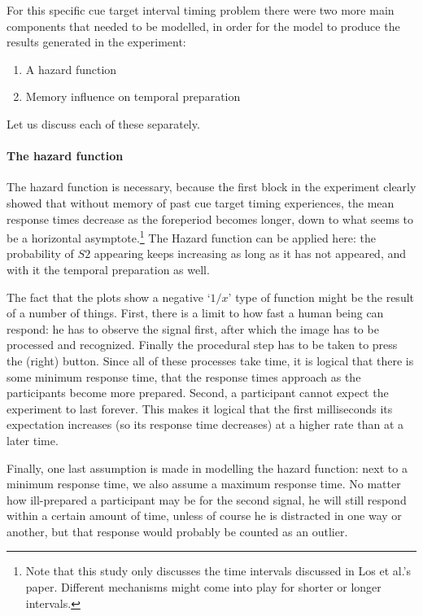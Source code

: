 \documentclass[10pt,letterpaper]{article}
\begin{document}
For this specific cue target interval timing problem there were two more main components that needed to be modelled, in order for the model to produce the results generated in the experiment:
\begin{enumerate}
	\item A hazard function
	\item Memory influence on temporal preparation
\end{enumerate}
Let us discuss each of these separately.

\paragraph{The hazard function}
The hazard function is necessary, because the first block in the experiment clearly showed that without memory of past cue target timing experiences, the mean response times decrease as the foreperiod becomes longer, down to what seems to be a horizontal asymptote.\footnote{Note that this study only discusses the time intervals discussed in Los et al.'s paper. Different mechanisms might come into play for shorter or longer intervals.} The Hazard function can be applied here: the probability of $S2$ appearing keeps increasing as long as it has not appeared, and with it the temporal preparation as well. 

The fact that the plots show a negative `$1/x$' type of function might be the result of a number of things. First, there is a limit to how fast a human being can respond: he has to observe the signal first, after which the image has to be processed and recognized. Finally the procedural step has to be taken to press the (right) button. Since all of these processes take time, it is logical that there is some minimum response time, that the response times approach as the participants become more prepared. Second, a participant cannot expect the experiment to last forever. This makes it logical that the first milliseconds its expectation increases (so its response time decreases) at a higher rate than at a later time. 

Finally, one last assumption is made in modelling the hazard function: next to a minimum response time, we also assume a maximum response time. No matter how ill-prepared a participant may be for the second signal, he will still respond within a certain amount of time, unless of course he is distracted in one way or another, but that response would probably be counted as an outlier.
\end{document}
